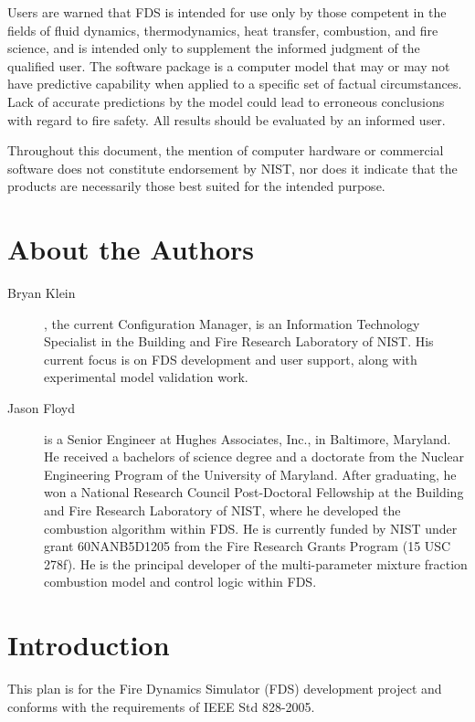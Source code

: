 \documentclass[11pt]{book}
\begin{document}
Users are warned that FDS is intended for use only by those competent
in the fields of fluid dynamics, thermodynamics, heat transfer, combustion, and fire science,
and is intended only to supplement the informed judgment of the qualified user.
The software package is a computer model that may or may not have predictive
capability when applied to a specific set of factual circumstances.
Lack of accurate predictions by the model could lead to erroneous
conclusions with regard to fire safety. All results should be evaluated by an informed user.

Throughout this document, the mention of computer hardware or commercial
software does not constitute endorsement by NIST, nor does it indicate that
the products are necessarily those best suited for the intended purpose.


\chapter{About the Authors}

\begin{description}
\item[Bryan Klein], the current Configuration Manager, is an Information Technology Specialist in the
Building and Fire Research Laboratory of NIST. His current focus is on FDS development and
user support, along with experimental model validation work.

\item[Jason Floyd] is a Senior Engineer at Hughes Associates, Inc., in
Baltimore, Maryland. He received a bachelors of science degree and a
doctorate from the Nuclear Engineering Program of the University of
Maryland. After graduating, he won a National Research Council
Post-Doctoral Fellowship at the Building and Fire Research Laboratory
of NIST, where he developed the combustion algorithm within FDS. He is
currently funded by NIST under grant 60NANB5D1205 from the Fire
Research Grants Program (15 USC 278f).  He is the principal developer
of the multi-parameter mixture fraction combustion model and control
logic within FDS.
\end{description}

\tableofcontents

\mainmatter

\chapter{Introduction}

This plan is for the Fire Dynamics Simulator (FDS) development project and conforms with the requirements of IEEE Std 828-2005.
\end{document}
